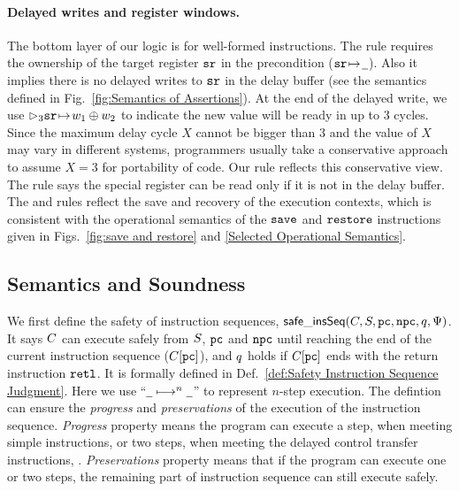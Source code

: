 \paragraph{\textbf{Delayed writes and register windows.}}
The bottom layer of our logic is for well-formed instructions.
The  rule requires the ownership
of the target
register $\texttt{sr}$ in the precondition (${\texttt{sr}} \!\mapsto\! {\underline{\ \,}}$).
Also it implies there is no delayed writes to $\texttt{sr}$
in the delay buffer (see the semantics defined in
Fig.~\ref{fig:Semantics of Assertions}).
At the end of the delayed write, we use
$\rhd_{3}{\texttt{sr}} \!\mapsto\! {w_1 \oplus w_2}$ to indicate
the new value will be ready in up to 3 cycles.
Since the maximum delay cycle $X$ cannot be bigger
than 3 and the value of $X$ may vary in different systems,
programmers usually take a conservative approach to
assume $X=3$ for portability of code. Our rule
reflects this conservative view.
The  rule says the special
register can be read only if it is not in the
delay buffer.
The  and  rules
reflect the save and recovery of the execution
contexts, which is consistent with the operational
semantics of the $\texttt{save}$ and $\texttt{restore}$ instructions
given in Figs.~\ref{fig:save and restore}
and \ref{Selected Operational Semantics}.

\subsection{Semantics and Soundness}
\label{subsec:Soundness}

We first define the safety of instruction sequences,
$\mathsf{safe\_insSeq}(C, S, \texttt{pc}, \texttt{npc}, q, \Psi)$.
It says $C$ can execute safely
from $S$, $\texttt{pc}$ and $\texttt{npc}$ until reaching
the end of the current instruction sequence ($C[\texttt{pc}]$),
and $q$ holds if $C[\texttt{pc}]$ ends with the return
instruction $\texttt{retl}{}$.
It is formally defined in Def.~\ref{def:Safety Instruction Sequence Judgment}.
Here we use ``$\underline{\ \,} \longmapsto^{n} \underline{\ \,}$'' to
represent $n$-step execution. The defintion can ensure 
the {\it progress} and {\it preservations} of the execution 
of the instruction sequence. {\it Progress} property means 
the program can execute a step, when meeting simple instructions, 
or two steps, when meeting the delayed control transfer instructions, 
. 
{\it Preservations} property means that if the program can execute 
one or two steps, the remaining part of instruction sequence can 
still execute safely. 

